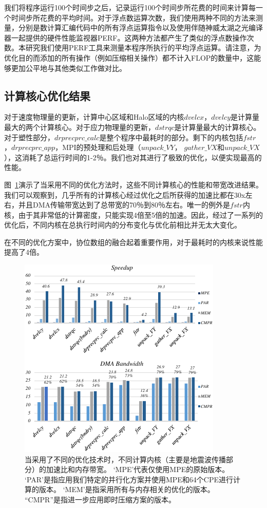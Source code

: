 \documentclass[degree=doctor]{thuthesis}
\begin{document}
我们将程序运行100个时间步之后，记录运行100个时间步所花费的时间来计算每一个时间步所花费的平均时间。对于浮点数运算次数，我们使用两种不同的方法来测量，分别是数计算汇编代码中的所有浮点运算指令以及使用伴随神威太湖之光编译器一起提供的硬件性能监视器PERF。这两种方法都产生了类似的浮点数操作次数。本研究我们使用PERF工具来测量本程序所执行的平均浮点运算。请注意，为优化目的而添加的所有操作（例如压缩相关操作）都不计入FLOP的数量中，这能够更加公平地与其他类似工作做对比。

\subsection{计算核心优化结果}

对于速度物理量的更新，计算中心区域和Halo区域的内核$ dvelcx，dvelcy $是计算量最大的两个计算核心。对于应力物理量的更新，$ dstrqc $是计算量最大的计算核心。对于塑性部分，$ drprecprc\_calc $是整个程序中最耗时的部分。剩下的内核包括$ fstr $，$ drprecprc\_app $，MPI的预处理和后处理（$ unpack\_VY $，
$ gather\_VX $和$ unpack\_VX $），这消耗了总运行时间的1-2％。我们也对其进行了极致的优化，以便实现最高的性能。

图~\ref{fig:kernel-result}演示了当采用不同的优化方法时，这些不同计算核心的性能和带宽改进结果。我们可以观察到，几乎所有的计算核心经过优化之后所获得的加速比都在30x左右，并且DMA传输带宽达到了总带宽的70％到80％左右。唯一的例外是$ fstr $内核，由于其非常低的计算密度，只能实现4倍至5倍的加速。因此，经过了一系列的优化后，不同内核在总执行时间内的分布变化与优化前相比并无太大变化。

在不同的优化方案中，协位数组的融合起着重要作用，对于最耗时的内核来说性能提高了4倍。

\begin{figure}[t]
\centering
\includegraphics[width=0.9\columnwidth]{awp_performance.pdf}
\caption{当采用了不同的优化技术时，不同计算内核（主要是地震波传播部分）的加速比和内存带宽。 `MPE'代表仅使用MPE的原始版本。 `PAR'是指应用我们特定的并行化方案并使用MPE和64个CPE进行计算的版本。 `MEM'是指采用所有与内存相关的优化的版本。 “CMPR”是指进一步应用即时压缩方案的版本。}
\label{fig:kernel-result}
\end{figure}
\end{document}
